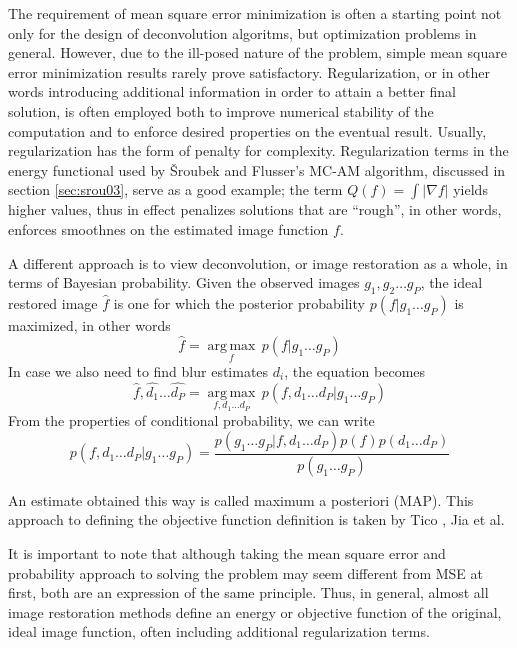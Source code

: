 \documentclass[12pt,notitlepage]{report}
\begin{document}
The requirement of mean square error minimization is often a starting point not only for the design of deconvolution algoritms, but optimization problems in general. However, due to the ill-posed nature of the problem, simple mean square error minimization results rarely prove satisfactory. Regularization, or in other words introducing additional information in order to attain a better final solution, is often employed both to improve numerical stability of the computation and to enforce desired properties on the eventual result. Usually, regularization has the form of penalty for complexity. Regularization terms in the energy functional used by Šroubek and Flusser's MC-AM algorithm, discussed in section \ref{sec:srou03}, serve as a good example; the term $Q(f) = \int |\nabla f|$ yields higher values, thus in effect penalizes solutions that are ``rough'', in other words, enforces smoothnes on the estimated image function $f$.        	 

A different approach is to view deconvolution, or image restoration as a whole, in terms of Bayesian probability. Given the observed images $g_1, g_2 \dots g_P$, the ideal restored image $\hat{f}$ is one for which the posterior probability $p(f|g_1 \dots g_P)$ is maximized, in other words 
\begin{equation}
	\label{eq:posterior_prob}
		\hat{f} = \underset{f}{\operatorname{arg\,max}} \, p(f|g_1 \dots g_P)
\end{equation}
In case we also need to find blur estimates $d_i$, the equation becomes 
\begin{equation}
	\label{eq:posterior_prob_ext}
		\hat{f},\hat{d_1} \dots \hat{d_P} = \underset{f,d_1 \dots d_P}{\operatorname{arg\,max}} \, p(f,d_1 \dots d_P |g_1 \dots g_P)
\end{equation}
From the properties of conditional probability, we can write 
\begin{equation}
	\label{eq:posterior_prob_prop}
		 p(f,d_1 \dots d_P |g_1 \dots g_P) = \frac{p(g_1 \dots g_P|f,d_1 \dots d_P)p(f)p(d_1 \dots d_P)}{p(g_1 \dots g_P)}
\end{equation}

An estimate obtained this way is called maximum a posteriori (MAP). This approach to defining the objective function definition is taken by Tico \cite{tico06} \cite{tico07}, Jia et al. \cite{jia04}


It is important to note that although taking the mean square error and probability approach to solving the problem may seem different from MSE at first, both are an expression of the same principle. Thus, in general, almost all image restoration methods define an energy or objective function of the original, ideal image function, often including additional regularization terms. 
\end{document}
